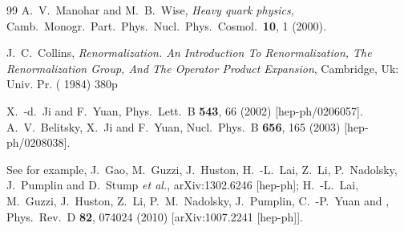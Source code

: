 \begin{thebibliography}{99}
  A.~V.~Manohar and M.~B.~Wise,
  {\it Heavy quark physics,}
  Camb.\ Monogr.\ Part.\ Phys.\ Nucl.\ Phys.\ Cosmol.\  {\bf 10}, 1 (2000).

  J.~C.~Collins,
  {\it Renormalization. An Introduction To Renormalization, The Renormalization Group, And The Operator Product Expansion},
  Cambridge, Uk: Univ. Pr. ( 1984) 380p

  X.~-d.~Ji and F.~Yuan,
  Phys.\ Lett.\ B {\bf 543}, 66 (2002)
  [hep-ph/0206057].
  A.~V.~Belitsky, X.~Ji and F.~Yuan,
  Nucl.\ Phys.\ B {\bf 656}, 165 (2003)
  [hep-ph/0208038].


See for example,
  J.~Gao, M.~Guzzi, J.~Huston, H.~-L.~Lai, Z.~Li, P.~Nadolsky, J.~Pumplin and D.~Stump {\it et al.},
  arXiv:1302.6246 [hep-ph];
  H.~-L.~Lai, M.~Guzzi, J.~Huston, Z.~Li, P.~M.~Nadolsky, J.~Pumplin, C.~-P.~Yuan and ,
  Phys.\ Rev.\ D {\bf 82}, 074024 (2010)
  [arXiv:1007.2241 [hep-ph]].


\end{thebibliography}
